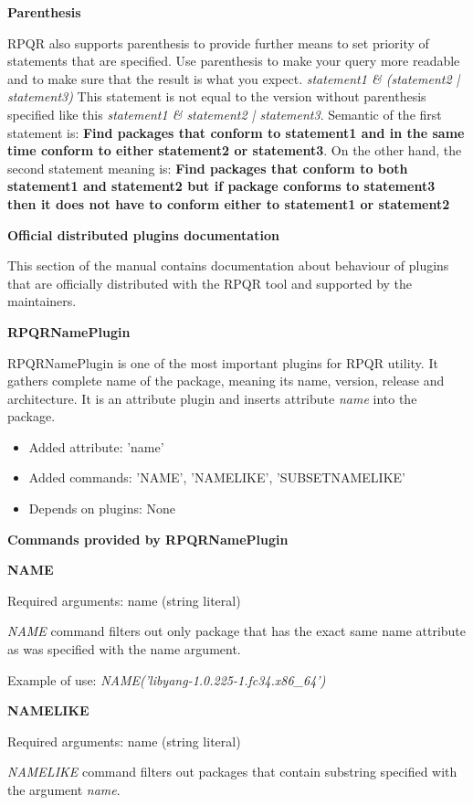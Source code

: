 \textbf{Parenthesis}

RPQR also supports parenthesis to provide further means to set priority of statements that are specified.
Use parenthesis to make your query more readable and to make sure that the result is what you expect.
\textit{statement1 \& (statement2 | statement3)} This statement is not equal to the version without
parenthesis specified like this \textit{statement1 \& statement2 | statement3}. Semantic of the first
statement is: \textbf{Find packages that conform to statement1 and in the same time conform to either
statement2 or statement3}. On the other hand, the second statement meaning is: \textbf{Find packages
that conform to both statement1 and statement2 but if package conforms to statement3 then it does not
have to conform either to statement1 or statement2}

\textbf{Official distributed plugins documentation}

This section of the manual contains documentation about behaviour of plugins that are officially
distributed with the RPQR tool and supported by the maintainers.

\textbf{RPQRNamePlugin}

RPQRNamePlugin is one of the most important plugins for RPQR utility. It gathers complete name of the
package, meaning its name, version, release and architecture. It is an attribute plugin and inserts
attribute \textit{name} into the package.

\begin{itemize}
  \item Added attribute: 'name'
  \item Added commands: 'NAME', 'NAMELIKE', 'SUBSETNAMELIKE'
  \item Depends on plugins: None
\end{itemize}

\textbf{Commands provided by RPQRNamePlugin}

\textbf{NAME}

Required arguments: name (string literal)

\textit{NAME} command filters out only package that has the exact same name attribute as was specified
with the name argument.

Example of use: \textit{NAME('libyang-1.0.225-1.fc34.x86\_64')}

\textbf{NAMELIKE}

Required arguments: name (string literal)

\textit{NAMELIKE} command filters out packages that contain substring specified with the argument
\textit{name}.

